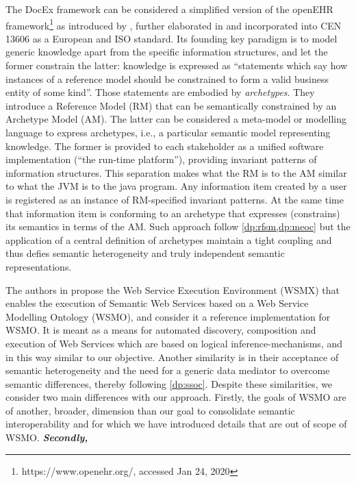 \documentclass[sort&compress,preprint,authoryear,3p,twocolumn]{elsarticle}
\begin{document}
The DocEx framework can be considered a simplified version of the
openEHR framework\footnote{https://www.openehr.org/, accessed Jan 24,
  2020} as introduced by \cite{Beale:2001vz}, further elaborated in
\citep{Beale2007a, Beale2008a, Beale2007, Beale2008, Beale2007b, Beale2007c}
and incorporated into CEN 13606 as a European and ISO standard. Its
founding key paradigm is to model generic knowledge apart from the
specific information structures, and let the former constrain the
latter: knowledge is expressed as ``statements which say how instances
of a reference model should be constrained to form a valid business
entity of some kind''. Those statements are embodied by
\emph{archetypes}. They introduce a Reference Model (RM) that can be
semantically constrained by an Archetype Model (AM). The latter can be
considered a meta-model or modelling language to express archetypes,
i.e., a particular semantic model representing knowledge. The former is
provided to each stakeholder as a unified software implementation (``the
run-time platform''), providing invariant patterns of information
structures. This separation makes what the RM is to the AM similar to
what the JVM is to the java program. Any information item created by a
user is registered as an instance of RM-specified invariant patterns. At
the same time that information item is conforming to an archetype that
expresses (constrains) its semantics in terms of the AM. Such approach
follow \cref{dp:rfsm,dp:meoc} but the application of a central
definition of archetypes maintain a tight coupling and thus defies
semantic heterogeneity and truly independent semantic representations.

The authors in \citep{Haller2005} propose the Web Service Execution
Environment (WSMX) that enables the execution of Semantic Web Services
based on a Web Service Modelling Ontology (WSMO), and consider it a
reference implementation for WSMO. It is meant as a means for automated
discovery, composition and execution of Web Services which are based on
logical inference-mechanisms, and in this way similar to our objective.
Another similarity is in their acceptance of semantic heterogeneity and
the need for a generic data mediator to overcome semantic differences,
thereby following \cref{dp:ssoc}. Despite these similarities, we
consider two main differences with our approach. Firstly, the goals of
WSMO are of another, broader, dimension than our goal to consolidate
semantic interoperability and for which we have introduced details that
are out of scope of WSMO. \textbf{\emph{Secondly,}}
\end{document}
